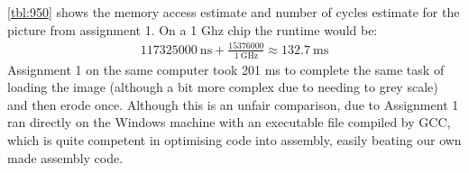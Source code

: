 \documentclass[a4paper, english]{article}
\numberwithin{equation}{section}
\begin{document}
\cref{tbl:950} shows the memory access estimate and number of cycles estimate for the picture from assignment 1. On a 1 Ghz chip the runtime would be:
\begin{align}
    \SI{117325000}{\nano\second} + \frac{15376000}{\SI{1}{\giga\hertz}} \approx \SI{132.7}{\milli\second}
\end{align}
Assignment 1 on the same computer took 201 ms to complete the same task of loading the image (although a bit more complex due to needing to grey scale) and then erode once. Although this is an unfair comparison, due to Assignment 1 ran directly on the Windows machine with an executable file compiled by GCC, which is quite competent in optimising code into assembly, easily beating our own made assembly code.

%
%




%
\end{document}
